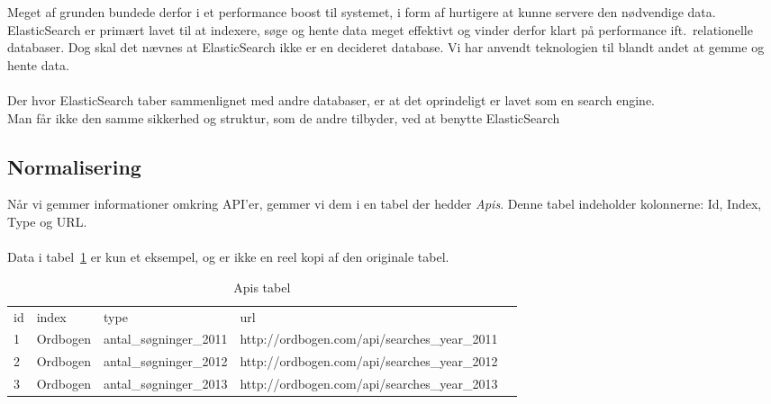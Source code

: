 Meget af grunden bundede derfor i et performance boost til systemet, i form af hurtigere at kunne servere den nødvendige data.
\\
ElasticSearch er primært lavet til at indexere, søge og hente data meget effektivt og vinder derfor klart på performance ift.\ relationelle databaser.
Dog skal det nævnes at ElasticSearch ikke er en decideret database. Vi har anvendt teknologien til blandt andet at gemme og hente data.\\
\\
Der hvor ElasticSearch taber sammenlignet med andre databaser, er at det oprindeligt er lavet som en search engine.
\\Man får ikke den samme sikkerhed og struktur, som de andre tilbyder, ved at benytte ElasticSearch
\subsection{Normalisering}
Når vi gemmer informationer omkring API'er, gemmer vi dem i en tabel der hedder \textit{Apis}. Denne tabel indeholder kolonnerne: Id, Index, Type og URL.
\\\\
Data i tabel~\ref{table:api-tabel} er kun et eksempel, og er ikke en reel kopi af den originale tabel.
\begin{table}[H]
    \centering
    \begin{tabular}{|l|l|l|l|l}
        \cline{1-4}
        id & index  &  type &  url &  \\ \cline{1-4}
        1 & Ordbogen & antal\_søgninger\_2011 & http://ordbogen.com/api/searches\_year\_2011 &  \\ \cline{1-4}
        2 & Ordbogen & antal\_søgninger\_2012 & http://ordbogen.com/api/searches\_year\_2012 &  \\ \cline{1-4}
        3 & Ordbogen & antal\_søgninger\_2013 & http://ordbogen.com/api/searches\_year\_2013 &  \\ \cline{1-4}
    \end{tabular}
    \caption{Apis tabel}
    \label{table:api-tabel}
\end{table}

